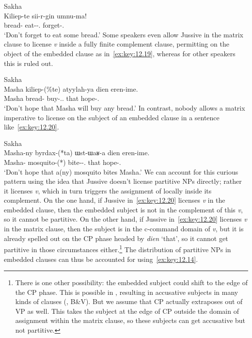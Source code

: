 \documentclass[output=paper]{langsci/langscibook}
\begin{document}
\ea\label{ex:key:12.18}Sakha\\
	\gll Kiliep-te  sii-r-gin  umnu-ma!\\
		bread-\Part{}  eat-\Aor{}-\Ssg{}.\Acc{}  forget-\Neg{}.\Imp{}\\
	\glt ‘Don’t forget to eat some bread.’
\z
Some speakers even allow Jussive in the matrix clause to license \emph{v}\textsubscript{\Imp} inside a fully finite complement clause, permitting  on the object of the embedded clause as in~\eqref{ex:key:12.19}, whereas for other speakers this is ruled out.

\ea\label{ex:key:12.19}Sakha\\
	\gll Masha  kiliep-(\%te) atyylah-ya dien eren-ime.\\
		Masha  bread-\Part{}  buy-\Fut{}.\Tsg.\Sbj{}  that  hope-\Neg{}.\Imp{}\\
	\glt ‘Don’t hope that Masha will buy any bread.’
\z
In contrast, nobody allows a matrix imperative to license
 on the subject of an embedded clause in a sentence
like~\eqref{ex:key:12.20}.

\ea\label{ex:key:12.20}Sakha\\
	\gll Masha-ny   byrdax-(*ta)         ɯst-ɯaʁ-a    dien  eren-ime.\\
		Masha-\Acc{}  mosquito-(*\Part{})  bite-\Fut{}-\Tsg.\Sbj{}  that    hope-\Neg{}.\Imp{}\\
	\glt ‘Don’t hope that a(ny) mosquito bites Masha.’
\z
We can account for this curious pattern using the idea that Jussive doesn’t
license partitive NPs directly; rather it licenses
\emph{v}\textsubscript{\Imp}, which in turn triggers the assignment of
 locally inside its complement. On the one hand, if Jussive
in~\eqref{ex:key:12.20} licenses \emph{v}\textsubscript{\Imp} in the embedded
clause, then the embedded subject is not in the complement of this
\emph{v}\textsubscript{\Imp}, so it cannot be partitive. On the other hand, if
Jussive in~\eqref{ex:key:12.20} licenses \emph{v}\textsubscript{\Imp} in the
matrix clause, then the subject is in the c-command domain of
\emph{v}\textsubscript{\Imp}, but it is already spelled out on the CP
phase headed by \emph{dien} ‘that’, so it cannot get partitive in
those circumstances either.\footnote{There is one other possibility: the
    embedded subject could shift to the edge of the CP phase. This
    is possible in , resulting in accusative subjects in many kinds
    of clauses (\citealt{Vinokurova2005}, B\&V). But we assume that CP actually
    extraposes out of VP as well.  This takes the subject at the edge of CP
outside the domain of  assignment within the matrix clause,
so these subjects can get accusative but not partitive.\label{fn:12.8}}  The
distribution of partitive NPs in embedded clauses can thus be accounted for
using~\eqref{ex:key:12.14}.
\end{document}
